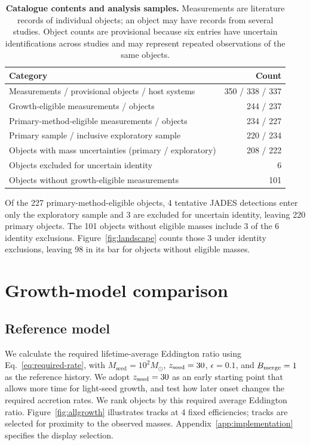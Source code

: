 \documentclass[11pt]{article}
\newcommand{\mseed}{M_{\mathrm{seed}}}
\begin{document}
\begin{table}[ht]
\centering
\caption{\textbf{Catalogue contents and analysis samples.} Measurements are
literature records of individual objects; an object may have records from
several studies. Object counts are provisional because six entries have uncertain
identifications across studies and may represent repeated observations of the
same objects.}
\begin{tabular}{@{}lr@{}}
\toprule
Category & Count \\
\midrule
Measurements / provisional objects / host systems & 350 / 338 / 337 \\
Growth-eligible measurements / objects & 244 / 237 \\
Primary-method-eligible measurements / objects & 234 / 227 \\
Primary sample / inclusive exploratory sample & 220 / 234 \\
Objects with mass uncertainties (primary / exploratory) & 208 / 222 \\
Objects excluded for uncertain identity & 6 \\
Objects without growth-eligible measurements & 101 \\
\bottomrule
\end{tabular}
\par\smallskip
\parbox{\textwidth}{\footnotesize
Of the 227 primary-method-eligible objects, 4 tentative JADES detections enter
only the exploratory sample and 3 are excluded for uncertain identity,
leaving 220 primary objects. The 101 objects without eligible masses include
3 of the 6 identity exclusions. Figure~\ref{fig:landscape} counts those 3
under identity exclusions, leaving 98 in its bar for objects without eligible masses.}
\label{tab:scale}
\end{table}

\FloatBarrier
\section{Growth-model comparison}

\subsection{Reference model}

We calculate the required lifetime-average Eddington ratio using
Eq.~\ref{eq:required-rate}, with $\mseed=10^2M_\odot$, $z_{\rm seed}=30$,
$\epsilon=0.1$, and $B_{\rm merge}=1$ as the reference history.
We adopt $z_{\rm seed}=30$ as an early starting point that allows more time
for light-seed growth, and test how later onset changes the required accretion rates.
We rank objects by this required average Eddington ratio.
Figure~\ref{fig:allgrowth} illustrates tracks at 4 fixed efficiencies;
tracks are selected for proximity to the observed masses.
Appendix~\ref{app:implementation} specifies the display selection.
\end{document}
